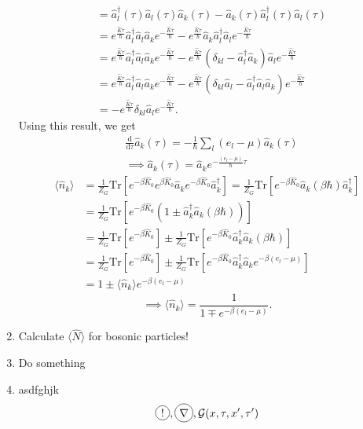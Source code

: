 \documentclass[11pt, a4paper]{article}
\newcommand*\circled[1]{\tikz[baseline=(char.base)]{
            \node[shape=circle,draw,inner sep=2pt] (char) {#1}}}
\newcommand{\dd}{\mathrm{d}}
\newcommand{\Tr}[1]{\mathrm{Tr}\left[#1\right]}
\begin{document}
\begin{enumerate}
    \begin{align*}
        [\hat a_l^{\dagger}(\tau)\hat a_l(\tau), \hat a_k(\tau)]
        &= \hat a_l^{\dagger}(\tau)\hat a_l(\tau)\hat a_k(\tau) - \hat a_k(\tau)\hat a_l^{\dagger}(\tau)\hat a_l(\tau)\\
        &= e^{\frac{\hat K\tau}{\hbar}} \hat a_l^{\dagger}\hat a_l\hat a_k e^{-\frac{\hat K\tau}{\hbar}}
        - e^{\frac{\hat K\tau}{\hbar}}\hat a_k\hat a_l^{\dagger}\hat a_le^{-\frac{\hat K\tau}{\hbar}}\\
        &= e^{\frac{\hat K\tau}{\hbar}} \hat a_l^{\dagger}\hat a_l\hat a_k e^{-\frac{\hat K\tau}{\hbar}}
        - e^{\frac{\hat K\tau}{\hbar}}(\delta_{kl} - \hat a_l^{\dagger}\hat a_k)\hat a_le^{-\frac{\hat K\tau}{\hbar}}\\
        &= e^{\frac{\hat K\tau}{\hbar}} \hat a_l^{\dagger}\hat a_l\hat a_k e^{-\frac{\hat K\tau}{\hbar}}
        - e^{\frac{\hat K\tau}{\hbar}}(\delta_{kl}\hat a_l - \hat a_l^{\dagger}\hat a_l\hat a_k)e^{-\frac{\hat K\tau}{\hbar}}\\
        &= - e^{\frac{\hat K\tau}{\hbar}}\delta_{kl}\hat a_le^{-\frac{\hat K\tau}{\hbar}}.
    \end{align*}
    Using this result, we get 
    \begin{align*}
        &\frac{\dd}{\dd\tau}\hat a_k(\tau) = -\frac{1}{\hbar}\sum\limits_{l}(e_l - \mu)\hat a_k(\tau)\\
        &\implies \hat a_k(\tau) = \hat a_k e^{-\frac{(e_l - \mu)}{\hbar}\tau}
    \end{align*}
    \begin{align*}
        \langle \hat n_k \rangle &= \frac{1}{Z_G}\Tr{e^{-\beta \hat K_0}e^{\beta \hat K_0}\hat a_ke^{-\beta \hat K_0}\hat a_k^{\dagger}}
        = \frac{1}{Z_G}\Tr{e^{-\beta \hat K_0} \hat a_k(\beta\hbar)\hat a_k^{\dagger}}\\
        & = \frac{1}{Z_G}\Tr{e^{-\beta \hat K_0} (1\pm \hat a_k^{\dagger}\hat a_k(\beta\hbar))}\\
        & = \frac{1}{Z_G}\Tr{e^{-\beta \hat K_0}} \pm \frac{1}{Z_G}\Tr{e^{-\beta \hat K_0}\hat a_k^{\dagger}\hat a_k(\beta\hbar)}\\
        & = \frac{1}{Z_G}\Tr{e^{-\beta \hat K_0}} \pm \frac{1}{Z_G}\Tr{e^{-\beta \hat K_0}\hat a_k^{\dagger}\hat a_ke^{-\beta(e_l - \mu)}}\\
        & = 1 \pm \langle \hat n_k \rangle e^{-\beta(e_l - \mu)}
    \end{align*}
    \begin{equation*}
        \implies \langle \hat n_k \rangle = \frac{1}{1 \mp e^{-\beta(e_l - \mu)}}.
    \end{equation*}
    
    \item Calculate $\langle \hat N \rangle$ for bosonic particles!
    \item Do something
    \item asdfghjk \begin{equation*}
        \circled{$!$}, \circled{$\nabla$}, \mathcal G(x, \tau, x', \tau')
    \end{equation*}

\end{enumerate}
\end{document}
